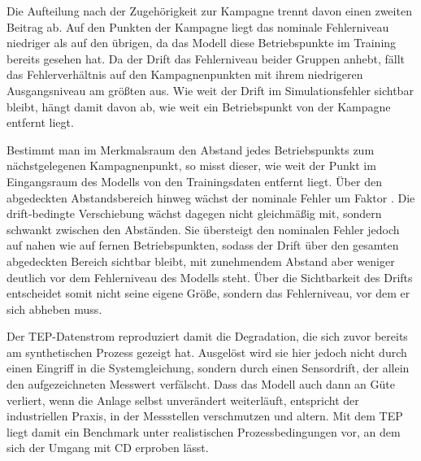 %
Die Aufteilung nach der Zugehörigkeit zur Kampagne trennt davon einen zweiten Beitrag ab. Auf den Punkten der Kampagne liegt das nominale Fehlerniveau niedriger als auf den übrigen, da das Modell diese Betriebspunkte im Training bereits gesehen hat. Da der Drift das Fehlerniveau beider Gruppen anhebt, fällt das Fehlerverhältnis auf den Kampagnenpunkten mit ihrem niedrigeren Ausgangsniveau am größten aus. Wie weit der Drift im Simulationsfehler sichtbar bleibt, hängt damit davon ab, wie weit ein Betriebspunkt von der Kampagne entfernt liegt. \par
%
Bestimmt man im Merkmalsraum den Abstand jedes Betriebspunkts zum nächstgelegenen Kampagnenpunkt, so misst dieser, wie weit der Punkt im Eingangsraum des Modells von den Trainingsdaten entfernt liegt. Über den abgedeckten Abstandsbereich hinweg wächst der nominale Fehler um Faktor \tepstatDistGrowth{}. Die drift-bedingte Verschiebung wächst dagegen nicht gleichmäßig mit, sondern schwankt zwischen den Abständen. Sie übersteigt den nominalen Fehler jedoch auf nahen wie auf fernen Betriebspunkten, sodass der Drift über den gesamten abgedeckten Bereich sichtbar bleibt, mit zunehmendem Abstand aber weniger deutlich vor dem Fehlerniveau des Modells steht. Über die Sichtbarkeit des Drifts entscheidet somit nicht seine eigene Größe, sondern das Fehlerniveau, vor dem er sich abheben muss. \par
%
Der \ac{TEP}-Datenstrom reproduziert damit die Degradation, die sich zuvor bereits am synthetischen Prozess gezeigt hat. Ausgelöst wird sie hier jedoch nicht durch einen Eingriff in die Systemgleichung, sondern durch einen Sensordrift, der allein den aufgezeichneten Messwert verfälscht. Dass das Modell auch dann an Güte verliert, wenn die Anlage selbst unverändert weiterläuft, entspricht der industriellen Praxis, in der Messstellen verschmutzen und altern. Mit dem \ac{TEP} liegt damit ein Benchmark unter realistischen Prozessbedingungen vor, an dem sich der Umgang mit \ac{CD} erproben lässt. \par
%
